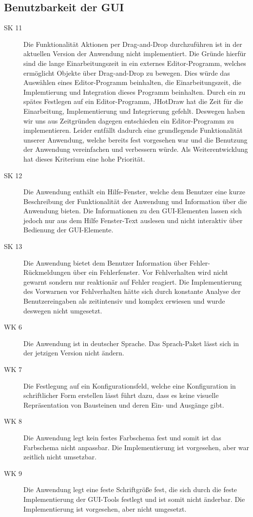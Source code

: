 \documentclass[parskip=full]{scrartcl}
\begin{document}
\subsection {Benutzbarkeit der GUI}

\begin{description}
\item[SK 11] Die Funktionalität Aktionen per Drag-and-Drop durchzuführen ist in der aktuellen Version der Anwendung nicht implementiert. Die Gründe hierfür sind die lange Einarbeitungszeit in ein externes Editor-Programm, welches ermöglicht Objekte über Drag-and-Drop zu bewegen. Dies würde das Auswählen eines Editor-Programm beinhalten, die Einarbeitungszeit, die Implemtierung und Integration dieses Programm beinhalten. Durch ein zu spätes Festlegen auf ein Editor-Programm, \gls{JHotDraw} hat die Zeit für die Einarbeitung, Implementierung und Integrierung gefehlt. Deswegen haben wir uns aus Zeitgründen dagegen entschieden ein Editor-Programm zu implementieren. Leider entfällt dadurch eine grundlegende Funktionalität unserer Anwendung, welche bereits fest vorgesehen war und die Benutzung der Anwendung vereinfachen und verbessern würde. Als Weiterentwicklung hat dieses Kriterium eine hohe Priorität.
\item[SK 12] Die Anwendung enthält ein Hilfe-Fenster, welche dem Benutzer eine kurze Beschreibung der Funktionalität der Anwendung und Information über die Anwendung bieten. Die Informationen zu den GUI-Elementen lassen sich jedoch nur aus dem Hilfe Fenster-Text auslesen und nicht interaktiv über Bedienung der GUI-Elemente.
\item[SK 13] Die Anwendung bietet dem Benutzer Information über Fehler-Rückmeldungen über ein Fehlerfenster. 
Vor Fehlverhalten wird nicht gewarnt sondern nur reaktionär auf Fehler reagiert. Die Implementierung des Vorwarnen vor Fehlverhalten hätte sich durch konstante Analyse der Benutzereingaben als zeitintensiv und komplex erwiesen und wurde deswegen nicht umgesetzt.
\item[WK 6] Die Anwendung ist in deutscher Sprache. Das Sprach-Paket lässt sich in der jetzigen Version nicht ändern.
\item[WK 7] Die Festlegung auf ein Konfigurationsfeld, welche eine Konfiguration in schriftlicher Form erstellen lässt führt dazu, dass es keine visuelle Repräsentation von Bausteinen und deren Ein- und Ausgänge gibt.
\item[WK 8] Die Anwendung legt kein festes Farbschema fest und somit ist das Farbschema nicht anpassbar. Die Implementierung ist vorgesehen, aber war zeitlich nicht umsetzbar.
\item[WK 9] Die Anwendung legt eine feste Schriftgröße fest, die sich durch die feste Implementierung der GUI-Tools festlegt und ist somit nicht änderbar. Die Implementierung ist vorgesehen, aber nicht umgesetzt.
\end{description}
\end{document}
